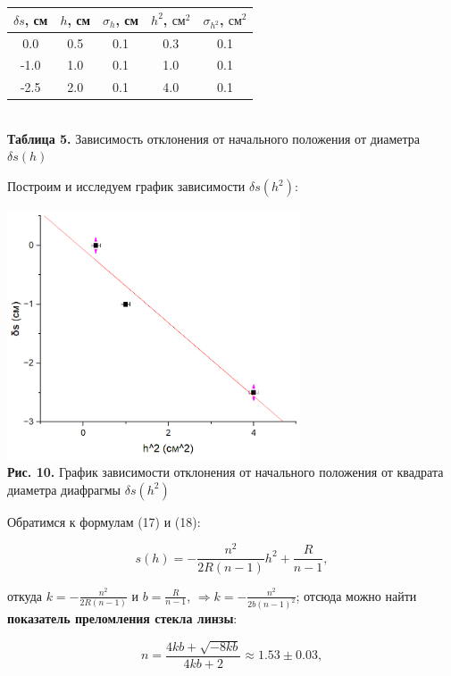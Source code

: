 \documentclass[a4paper,12pt]{article} %
\begin{document}
\begin{center}
\begin{tabular}{|c|c|c|c|c|}\hline
$ \delta s $, см & $ h $, см & $ \sigma_{h} $, см & $ h^2 $, $ \text{см}^2 $ & $ \sigma_{h^2} $, $ \text{см}^2 $ \\\hline
0.0 & 0.5 & 0.1 & 0.3 & 0.1 \\\hline
-1.0 & 1.0 & 0.1 & 1.0 & 0.1 \\\hline
-2.5 & 2.0 & 0.1 & 4.0 & 0.1 \\\hline
\end{tabular} \\
\hfill \break \textbf {Таблица 5.} Зависимость отклонения от начального положения от диаметра $\delta s(h)$\\
\end{center}

\hfill \break Построим и исследуем график зависимости $\delta s(h^2)$:

\begin{center}
\includegraphics[width=0.65\textwidth]{4.1.1_10.png}\\
\textbf{Рис. 10.} График зависимости отклонения от начального положения от квадрата диаметра диафрагмы $\delta s (h^2)$ \\
\end{center}

\hfill \break Обратимся к формулам (17) и (18):

$$
s(h) = - \frac {n^2} {2R(n - 1)} h^2 + \frac {R} {n - 1},
$$

\hfill \break откуда $k = - \frac {n^2} {2R(n - 1)}$ и $b = \frac {R} {n - 1}$, $\Rightarrow k = - \frac {n^2} {2b(n-1)^2}$; отсюда можно найти \textbf{показатель преломления стекла линзы}:

$$
n = \frac {4kb + \sqrt{-8kb}} {4kb + 2} \approx 1.53 \pm 0.03,
$$
\end{document}
